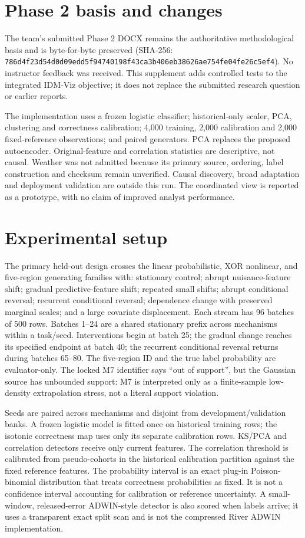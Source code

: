 \documentclass[11pt,a4paper]{article}
\begin{document}
\section{Phase 2 basis and changes}
The team's submitted Phase 2 DOCX remains the authoritative methodological basis and is byte-for-byte preserved (SHA-256: \texttt{786d4f23\allowbreak{}d54d0d09\allowbreak{}edd5f947\allowbreak{}40198f43\allowbreak{}ca3b406e\allowbreak{}b38626ae\allowbreak{}754fe04f\allowbreak{}e26c5ef4}). No instructor feedback was received. This supplement adds controlled tests to the integrated IDM-Viz objective; it does not replace the submitted research question or earlier reports.

The implementation uses a frozen logistic classifier; historical-only scaler, PCA, clustering and correctness calibration; 4,000 training, 2,000 calibration and 2,000 fixed-reference observations; and paired generators. PCA replaces the proposed autoencoder. Original-feature and correlation statistics are descriptive, not causal. Weather was not admitted because its primary source, ordering, label construction and checksum remain unverified. Causal discovery, broad adaptation and deployment validation are outside this run. The coordinated view is reported as a prototype, with no claim of improved analyst performance.

\section{Experimental setup}
The primary held-out design crosses the linear probabilistic, XOR nonlinear, and five-region generating families with: stationary control; abrupt nuisance-feature shift; gradual predictive-feature shift; repeated small shifts; abrupt conditional reversal; recurrent conditional reversal; dependence change with preserved marginal scales; and a large covariate displacement. Each stream has 96 batches of 500 rows. Batches 1--24 are a shared stationary prefix across mechanisms within a task/seed. Interventions begin at batch 25; the gradual change reaches its specified endpoint at batch 40; the recurrent conditional reversal returns during batches 65--80. The five-region ID and the true label probability are evaluator-only. The locked M7 identifier says ``out of support'', but the Gaussian source has unbounded support: M7 is interpreted only as a finite-sample low-density extrapolation stress, not a literal support violation.

Seeds are paired across mechanisms and disjoint from development/validation banks. A frozen logistic model is fitted once on historical training rows; the isotonic correctness map uses only its separate calibration rows. KS/PCA and correlation detectors receive only current features. The correlation threshold is calibrated from pseudo-cohorts in the historical calibration partition against the fixed reference features. The probability interval is an exact plug-in Poisson-binomial distribution that treats correctness probabilities as fixed. It is not a confidence interval accounting for calibration or reference uncertainty. A small-window, released-error ADWIN-style detector is also scored when labels arrive; it uses a transparent exact split scan and is not the compressed River ADWIN implementation.
\end{document}
